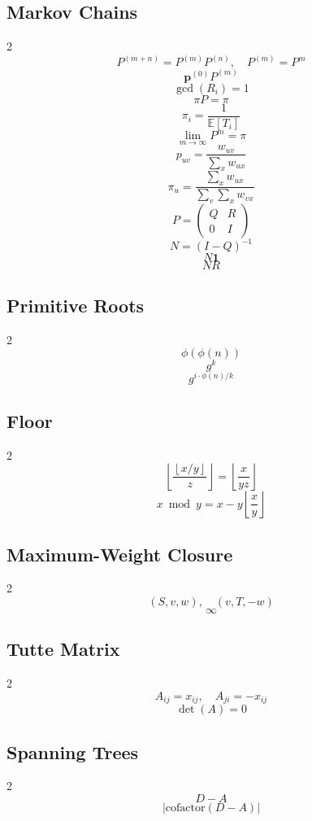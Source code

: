\subsection{Markov Chains}
\begin{multicols}{2}
\[
P^{(m+n)}=P^{(m)}P^{(n)}, \quad P^{(m)}=P^m
\]
\[
\mathbf{p}^{(0)}P^{(m)}
\]
\[
\gcd(R_i)=1
\]
\[
\pi P=\pi
\]
\[
\pi_i=\frac{1}{\mathbb{E}[T_i]}
\]
\[
\lim_{m\to\infty} P^m=\pi
\]
\[
p_{uv}=\frac{w_{uv}}{\sum_x w_{ux}}
\]
\[
\pi_u=\frac{\sum_x w_{ux}}{\sum_v\sum_x w_{vx}}
\]
\[
P=
\begin{pmatrix}
Q & R\\
0 & I
\end{pmatrix}
\]
\[
N=(I-Q)^{-1}
\]
\[
N\mathbf{1}
\]
\[
NR
\]
\end{multicols}

\subsection{Primitive Roots}
\begin{multicols}{2}
\[
\phi(\phi(n))
\]
\[
g^k
\]
\[
g^{i\cdot \phi(n)/k}
\]
\end{multicols}

\subsection{Floor}
\begin{multicols}{2}
\[
\left\lfloor \frac{\left\lfloor x/y\right\rfloor}{z}\right\rfloor=\left\lfloor \frac{x}{yz}\right\rfloor
\]
\[
x \bmod y = x - y\left\lfloor \frac{x}{y}\right\rfloor
\]
\end{multicols}

\subsection{Maximum-Weight Closure}
\begin{multicols}{2}
\[
(S,v,w),\quad (v,T,-w)
\]
\[
\infty
\]
\end{multicols}

\subsection{Tutte Matrix}
\begin{multicols}{2}
\[
A_{ij}=x_{ij}, \quad A_{ji}=-x_{ij}
\]
\[
\det(A)=0
\]
\end{multicols}

\subsection{Spanning Trees}
\begin{multicols}{2}
\[
D-A
\]
\[
\left|\mathrm{cofactor}(D-A)\right|
\]
\end{multicols}

